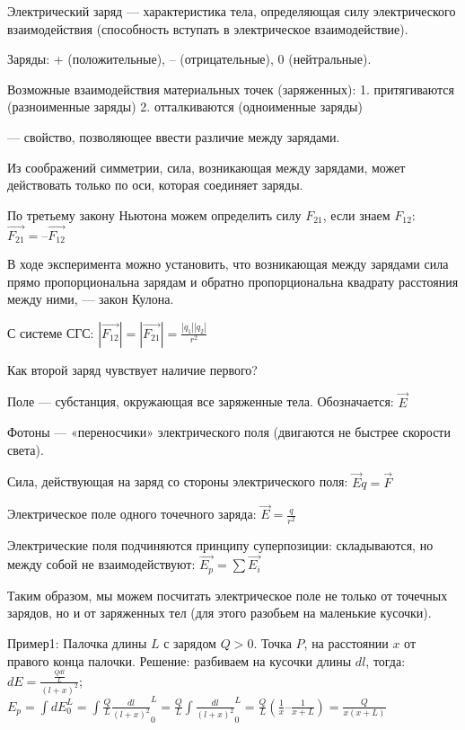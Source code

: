 \newcommand{\img}[1]{\texttt{[image: \#1.jpg]}}

Электрический заряд — характеристика тела, определяющая силу электрического взаимодействия (способность вступать в электрическое взаимодействие).

Заряды: + (положительные), – (отрицательные), 0 (нейтральные).

Возможные взаимодействия материальных точек (заряженных):
1.	притягиваются (разноименные заряды)
2.	отталкиваются (одноименные заряды)

 — свойство, позволяющее ввести различие между зарядами.

Из соображений симметрии, сила, возникающая между зарядами, может действовать только по оси, которая соединяет заряды.

По третьему закону Ньютона можем определить силу $F_21$, если знаем $F_12$: $\overrightarrow{F_21} = – \overrightarrow{F_12}$

В ходе эксперимента можно установить, что возникающая между зарядами сила прямо пропорциональна зарядам и обратно пропорциональна квадрату расстояния между ними, — закон Кулона.

С системе СГС: $|\overrightarrow{F_12} | = |\overrightarrow{F_21}| = \frac{|q_1||q_2|}{r^2}$

Как второй заряд чувствует наличие первого?

Поле — субстанция, окружающая все заряженные тела. Обозначается: $\overrightarrow{E}$

Фотоны — «переносчики» электрического поля (двигаются не быстрее скорости света).

Сила, действующая на заряд со стороны электрического поля: $\overrightarrow{E}q = \overrightarrow{F}$

Электрическое поле одного точечного заряда: $\overrightarrow{E} = \frac{q}{r^2}$

Электрические поля подчиняются принципу суперпозиции: складываются, но между собой не взаимодействуют: $\overrightarrow{E_p} = \sum{\overrightarrow{E_i}}$

Таким образом, мы можем посчитать электрическое поле не только от точечных зарядов, но и от заряженных тел (для этого разобьем на маленькие кусочки).

Пример1: Палочка длины $L$ с зарядом $Q > 0$. Точка $P$, на расстоянии $x$ от правого конца палочки.
Решение: разбиваем на кусочки длины $dl$, тогда: $dE = \frac{\frac{Qdl}{L}}{(l + x)^2}$; $E_p = \int{dE}_0^L = \int{\frac{Q}{L}\frac{dl}{(l + x)^2}}_0^L = \frac{Q}{L}\int{\frac{dl}{(l + x)^2}}_0^L  = \frac{Q}{L}(\frac{1}{x} – \frac{1}{x + L}) = \frac{Q}{x(x + L)}$

